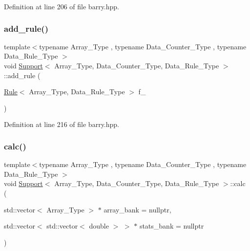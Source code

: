Definition at line 206 of file barry.\+hpp.

\mbox{\label{classbarry_1_1_support_aa817cb5d6c48dda3ecfeef2c5897b537}} 
\subsubsection{\texorpdfstring{add\+\_\+rule()}{add\_rule()}\hspace{0.1cm}{\footnotesize\ttfamily [2/2]}}
{\footnotesize\ttfamily template$<$typename Array\+\_\+\+Type , typename Data\+\_\+\+Counter\+\_\+\+Type , typename Data\+\_\+\+Rule\+\_\+\+Type $>$ \\
void \hyperlink{classbarry_1_1_support}{Support}$<$ Array\+\_\+\+Type, Data\+\_\+\+Counter\+\_\+\+Type, Data\+\_\+\+Rule\+\_\+\+Type $>$\+::add\+\_\+rule (\begin{DoxyParamCaption}\item[{\hyperlink{classbarry_1_1_rule}{Rule}$<$ Array\+\_\+\+Type, Data\+\_\+\+Rule\+\_\+\+Type $>$}]{f\+\_\+ }\end{DoxyParamCaption})\hspace{0.3cm}{\ttfamily [inline]}}



Definition at line 216 of file barry.\+hpp.

\mbox{\label{classbarry_1_1_support_afa36b8c1348e28c51296379157f58081}} 
\subsubsection{\texorpdfstring{calc()}{calc()}}
{\footnotesize\ttfamily template$<$typename Array\+\_\+\+Type , typename Data\+\_\+\+Counter\+\_\+\+Type , typename Data\+\_\+\+Rule\+\_\+\+Type $>$ \\
void \hyperlink{classbarry_1_1_support}{Support}$<$ Array\+\_\+\+Type, Data\+\_\+\+Counter\+\_\+\+Type, Data\+\_\+\+Rule\+\_\+\+Type $>$\+::calc (\begin{DoxyParamCaption}\item[{std\+::vector$<$ Array\+\_\+\+Type $>$ $\ast$}]{array\+\_\+bank = {\ttfamily nullptr},  }\item[{std\+::vector$<$ std\+::vector$<$ double $>$ $>$ $\ast$}]{stats\+\_\+bank = {\ttfamily nullptr} }\end{DoxyParamCaption})\hspace{0.3cm}{\ttfamily [inline]}}



